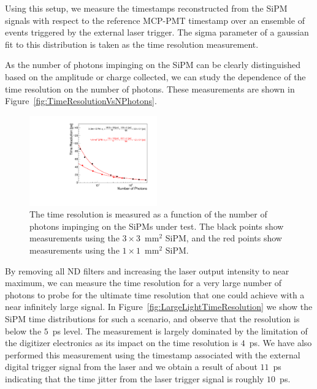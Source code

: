 
Using this setup, we measure the timestamps reconstructed from the SiPM signals
with respect to the reference MCP-PMT timestamp over an ensemble of events
triggered by the external laser trigger. The sigma parameter of a gaussian fit
to this distribution is taken as the time resolution measurement.

As the number of photons impinging on the SiPM can be clearly distinguished 
based on the amplitude or charge collected, we can study the dependence of the 
time resolution on the number of photons. These measurements are shown in 
Figure~\ref{fig:TimeResolutionVsNPhotons}.


\begin{figure}[htbp] 
\centering
\includegraphics[width=0.49\textwidth]{figures/TimeResolutionVsNPhotons.pdf}
\caption{ The time resolution is measured as a function of the number of photons 
impinging on the SiPMs under test. The black points show measurements using the
$3\times3$~$\mathrm{mm}^{2}$ SiPM, and the red points show measurements
using the $1\times1$~$\mathrm{mm}^{2}$ SiPM. \label{fig:TimeResolutionVsNPhotons}
} 
\label{fig:pulses} 
\end{figure} 


By removing all ND filters and increasing the laser output intensity to near 
maximum, we can measure the time resolution for a very large number of photons 
to probe for the ultimate time resolution that one could achieve with a near 
infinitely large signal. In Figure~\ref{fig:LargeLightTimeResolution} we show 
the SiPM time distributions for such a scenario, and observe that the resolution 
is below the $5$~ps level. The measurement is largely dominated by the limitation
of the digitizer electronics as its impact on the time resolution is $4$~ps. We 
have also performed this measurement using the timestamp associated with the 
external digital trigger signal from the laser and we obtain a result of about 
$11$~ps indicating that the time jitter from the laser trigger signal is roughly 
$10$~ps. 

